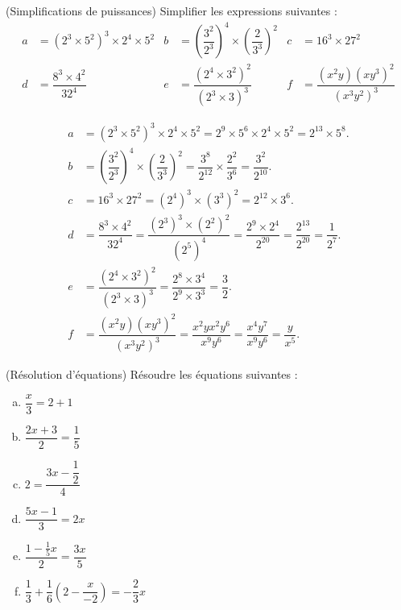 \documentclass[12pt,
addpoints,
fleqn
]{exam}
\begin{document}
\begin{questions}
\begin{solution}
\end{solution}


\question (Simplifications de puissances) Simplifier les expressions suivantes :
\begin{align*}
a&= \left(2^3\times 5^2\right)^3\times 2^4 \times 5^2 &b&=\left(\dfrac{3^2}{2^3}\right)^4\times\left(\dfrac{2}{3^3}\right)^2 &c&=16^3\times 27^2 \\
d&=\dfrac{8^3\times 4^2}{32^4} &e&=\dfrac{\left(2^4\times 3^2\right)^2}{\left(2^3\times 3\right)^3} &f&=\dfrac{(x^2y)\left(xy^3\right)^2}{\left(x^3y^2\right)^3}
\end{align*}

\begin{solution}
\begin{align*}
a&=\left(2^3\times 5^2\right)^3 \times 2^4 \times 5^2 = 2^9\times 5^6 \times 2^4 \times 5^2 = \boxed{2^{13}\times 5^8}.\\
b&=\left(\dfrac{3^2}{2^3}\right)^4\times\left(\dfrac{2}{3^3}\right)^2 = \dfrac{3^8}{2^12}\times\dfrac{2^2}{3^6}=\boxed{\dfrac{3^2}{2^{10}}}.\\
c&=16^3\times 27^2 = \left(2^4\right)^3\times\left(3^3\right)^2 = \boxed{2^{12}\times 3^6}.\\
d&=\dfrac{8^3\times 4^2}{32^4} = \dfrac{(2^3)^3\times(2^2)^2}{(2^5)^4}= \dfrac{2^9\times 2^4}{2^{20}}=\dfrac{2^{13}}{2^{20}}=\boxed{\dfrac{1}{2^7}}.\\
e&=\dfrac{\left(2^4\times 3^2\right)^2}{\left(2^3\times 3\right)^3} = \dfrac{2^8\times 3^4}{2^9\times 3^3}=\boxed{\dfrac{3}{2}}.\\
f&=\dfrac{(x^2y)(xy^3)^2}{(x^3y^2)^3}=\dfrac{x^2yx^2y^6}{x^9y^6}=\dfrac{x^4 y^7}{x^9y^6} =\boxed{\dfrac{y}{x^5}}.
\end{align*}

\end{solution}

\question (Résolution d'équations) Résoudre les équations suivantes : 
\begin{multicols}{3}
\begin{enumerate}[(a)] 
\item $\dfrac{x}{3}=2+1$
\item $\dfrac{2x+3}{2}=\dfrac{1}{5}$ 
\item $2=\dfrac{3x-\dfrac{1}{2}}{4}$
\item $\dfrac{5x-1}{3}=2x$
\item $\dfrac{1-\frac{1}{5}x}{2}=\dfrac{3x}{5}$
\item $\dfrac{1}{3}+\dfrac{1}{6}\left(2-\dfrac{x}{-2}\right)= -\dfrac{2}{3}x$
\end{enumerate}
\end{multicols}


\end{questions}
\end{document}
